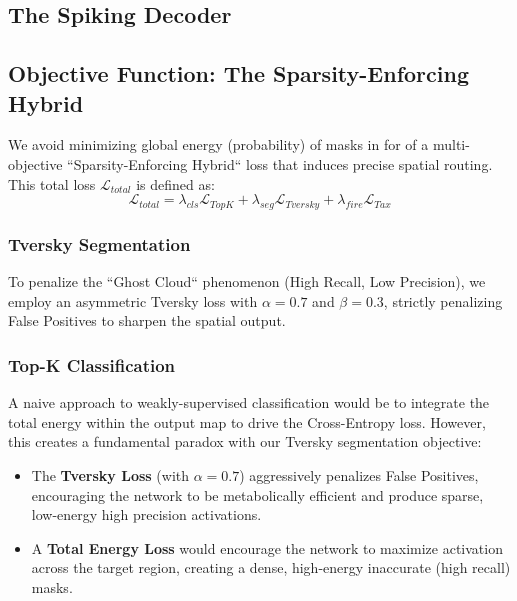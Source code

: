 \documentclass[conference]{IEEEtran}
\begin{document}
\subsection{The Spiking Decoder} %



\subsection{Objective Function: The Sparsity-Enforcing Hybrid}
We avoid minimizing global energy (probability) of masks in for of a multi-objective ``Sparsity-Enforcing Hybrid`` loss that induces precise spatial routing. This total loss $\mathcal{L}_{total}$ is defined as:
\begin{equation}
    \mathcal{L}_{total} = \lambda_{cls} \mathcal{L}_{TopK} + \lambda_{seg} \mathcal{L}_{Tversky} + \lambda_{fire} \mathcal{L}_{Tax} \label{eq_hybridloss}
\end{equation}

\subsubsection{Tversky Segmentation}
To penalize the ``Ghost Cloud`` phenomenon (High Recall, Low Precision), we employ an asymmetric Tversky loss \cite{Salehi2017} with $\alpha=0.7$ and $\beta=0.3$, strictly penalizing False Positives to sharpen the spatial output.

\subsubsection{Top-K Classification}
A naive approach to weakly-supervised classification would be to integrate the total energy within the output map to drive the Cross-Entropy loss. However, this creates a fundamental paradox with our Tversky segmentation objective:


\begin{itemize}
    \item The \textbf{Tversky Loss} (with $\alpha=0.7$) aggressively penalizes False Positives, encouraging the network to be metabolically efficient and produce sparse, low-energy high precision activations.
    \item A \textbf{Total Energy Loss} would encourage the network to maximize activation across the target region, creating a dense, high-energy inaccurate (high recall) masks.
\end{itemize}
\end{document}
